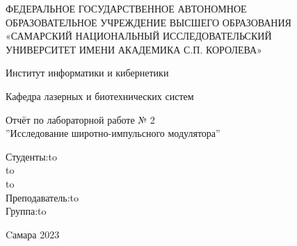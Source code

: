 \begin{titlepage}
\newpage
\doublespacing
\begin{center}
ФЕДЕРАЛЬНОЕ ГОСУДАРСТВЕННОЕ АВТОНОМНОЕ\\
ОБРАЗОВАТЕЛЬНОЕ УЧРЕЖДЕНИЕ ВЫСШЕГО ОБРАЗОВАНИЯ\\
«САМАРСКИЙ НАЦИОНАЛЬНЫЙ ИССЛЕДОВАТЕЛЬСКИЙ\\
УНИВЕРСИТЕТ ИМЕНИ АКАДЕМИКА С.П. КОРОЛЕВА»	
 \\
\end{center}

\vspace{5em}

\begin{center}
 Институт информатики и кибернетики \\ 
\end{center}

\begin{center}
Кафедра лазерных и биотехнических систем \\ 
\end{center}


\vspace{3em}

\begin{center}
{Отчёт по лабораторной работе № 2\\''Исследование широтно-импульсного модулятора''}
\end{center}

\vspace{11em}



\newbox{\lbox}
\newlength{\maxl}
\setlength{\maxl}{\wd\lbox}
\hfill\parbox{7cm}{
\hspace*{4cm}\hspace*{-4cm}Студенты:\hfill\hbox to\\
\hspace*{4cm}\hspace*{-4cm}\hfill\hbox to\\
\hspace*{4cm}\hspace*{-4cm}\hfill\hbox to\\
\hspace*{4cm}\hspace*{-4cm}Преподаватель:\hfill\hbox to\\
\hspace*{4cm}\hspace*{-4cm}Группа:\hfill\hbox to\\
}

\vspace{\fill}

\begin{center}
Cамара 2023
\end{center}

\end{titlepage}
\setcounter{page}{2}